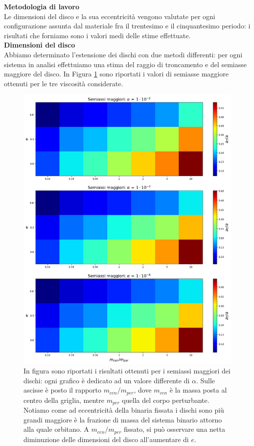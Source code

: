 \documentclass[12pt, a4paper]{report}
\begin{document}
\textbf{Metodologia di lavoro}\\

Le dimensioni del disco e la sua eccentricità vengono valutate per ogni configurazione assunta dal materiale fra il trentesimo e il cinquantesimo periodo: i risultati che forniamo sono i valori medi delle stime effettuate. \\

\textbf{Dimensioni del disco}\\

Abbiamo determinato l'estensione dei dischi con due metodi differenti: per ogni sistema in analisi effettuiamo una stima del raggio di troncamento e del semiasse maggiore del disco. In Figura \ref{fig:sax_magg} sono riportati i valori di semiasse maggiore ottenuti per le tre viscosità considerate.

\begin{figure}[H]
    \centering
    \includegraphics[width=\textwidth]{Immagini/graf_riass.png}
    \caption{In figura sono riportati i risultati ottenuti per i semiassi maggiori dei dischi: ogni grafico è dedicato ad un valore differente di $\alpha$. Sulle ascisse è posto il rapporto $m_{cen}/m_{per}$, dove $m_{cen}$ è la massa posta al centro della griglia, mentre $m_{per}$ quella del corpo perturbante. Notiamo come ad eccentricità della binaria fissata i dischi sono più grandi maggiore è la frazione di massa del sistema binario attorno alla quale orbitano. A $m_{cen}/m_{per}$ fissato, si può osservare una netta diminuzione delle dimensioni del disco all'aumentare di $e$.}
    \label{fig:sax_magg}
\end{figure}
\end{document}
